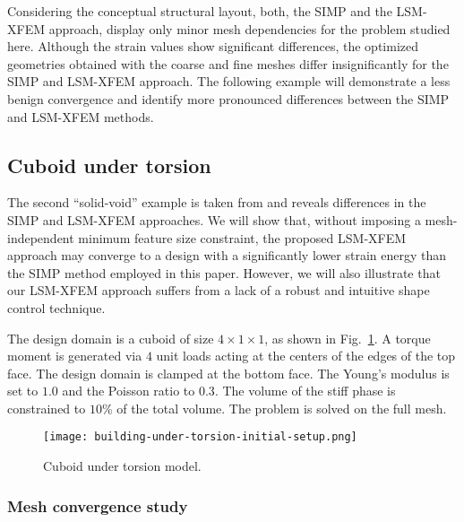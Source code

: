 Considering the conceptual structural layout, both, the SIMP and the LSM-XFEM approach, display only minor mesh dependencies for the problem studied here. Although the strain values show significant differences, the optimized geometries obtained with the coarse and fine meshes differ insignificantly for the SIMP and LSM-XFEM approach. The following example will demonstrate a less benign convergence and identify more pronounced differences between the SIMP and LSM-XFEM methods.


\subsection{Cuboid under torsion}
\label{sec:building-under-torsion}

The second ``solid-void'' example is taken from \citet{NPS+:12} and reveals differences in the SIMP and LSM-XFEM approaches. We will show that, without imposing a mesh-independent minimum feature size constraint,  the proposed LSM-XFEM approach may converge to a design with a significantly lower strain energy than the SIMP method employed in this paper. However, we will also illustrate that our LSM-XFEM approach suffers from a lack of a robust and intuitive shape control technique.

The design domain is a cuboid of size $4 \times 1 \times 1$, as shown in Fig.~\ref{fig:building-under-torsion-initial-setup}. A torque moment is generated via $4$ unit loads acting at the centers of the edges of the top face. The design domain is clamped at the bottom face. The Young's modulus is set to $1.0$ and the Poisson ratio to $0.3$. The volume of the stiff phase is constrained to $10$\% of the total volume. The problem is solved on the full mesh.
%
\begin{figure}
	\centering
	\texttt{[image: building-under-torsion-initial-setup.png]}
	\caption{Cuboid under torsion model.}
	\label{fig:building-under-torsion-initial-setup}
\end{figure}


\subsubsection{Mesh convergence study}
\label{sec:mesh-convergence-study}

